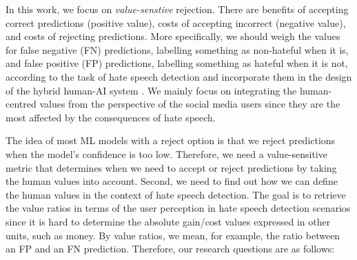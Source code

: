 %
In this work, we focus on \textit{value-senstive} rejection.
%
There are benefits of accepting correct predictions (positive value), costs of accepting incorrect (negative value), and costs of rejecting predictions.
%
More specifically, we should weigh the values for false negative (FN) predictions, labelling something as non-hateful when it is, and false positive (FP) predictions, labelling something as hateful when it is not, according to the task of hate speech detection and incorporate them in the design of the hybrid human-AI system \citep{sayin2021science}.
%
We mainly focus on integrating the human-centred values from the perspective of the social media users since they are the most affected by the consequences of hate speech.
%

%
The idea of most ML models with a reject option is that we reject predictions when the model's confidence is too low.
%
Therefore, we need a value-sensitive metric that determines when we need to accept or reject predictions by taking the human values into account.
%
Second, we need to find out how we can define the human values in the context of hate speech detection.
%
The goal is to retrieve the value ratios in terms of the user perception in hate speech detection scenarios since it is hard to determine the absolute gain/cost values expressed in other units, such as money.
%
By value ratios, we mean, for example, the ratio between an FP and an FN prediction.
%
Therefore, our research questions are as follows:
%
\noindent{}


